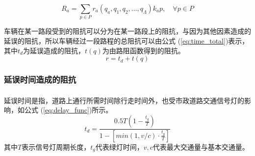 \documentclass[fontset=fandol,a4paper,12pt]{ctexart}
\newcommand{\upcite}[1]{\textsuperscript{\textsuperscript{\cite{#1}}}}
\renewcommand{\eqref}[1]{公式 (\ref{#1})}
\begin{document}
		\begin{equation}
			R_a=\sum\limits_{p\in P}r_a(q_a,q_1,q_2,\dots,q_\Lambda)k_ap,\quad\forall p \in P
			\label{eq:res_for_p}
		\end{equation}
		
		车辆在某一路段受到的阻抗可以分为在某一路段上的阻抗，与因为其他因素造成的延误的阻抗，所以车辆经过一段路程的总阻抗可以由\eqref{eq:time_total}表示，其中$ t_d $为延误造成的阻抗，$t(q)$为由路阻函数得到的阻抗。
		\begin{equation}
			r = t_d + t(q)
			\label{eq:time_total}
		\end{equation}		
		
		\subsubsection{延误时间造成的阻抗}
			延误时间\upcite{任福田2003交通工程学}是指，道路上通行所需时间除行走时间外，也受市政道路交通信号灯的影响，如\eqref{eq:delay_func}所示。
			\begin{equation}
				t_d=\frac{0.5T(1-\frac{t_g}{T})}{1-[min(1,v/c)\cdot{\frac{t_g}{T}}]}
				\label{eq:delay_func}
			\end{equation}
			其中$ T $表示信号灯周期长度，$ t_g $代表绿灯时间，$ v,c $代表最大交通量与基本交通量。
			
\end{document}
